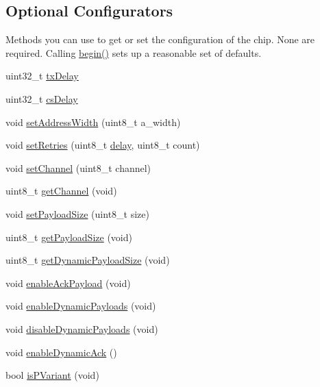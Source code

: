 \subsection*{Optional Configurators}
\label{_amgrpe1a83b99ec8153e5baf680edeeed1586}%
 Methods you can use to get or set the configuration of the chip. None are required. Calling \hyperlink{classRF24_a048a20c73c7d9b2e02dcbae6fb9c4ba8}{begin()} sets up a reasonable set of defaults. \begin{DoxyCompactItemize}
\item 
uint32\+\_\+t \hyperlink{classRF24_a958fb99f54415101ca008ab11b3bfe79}{tx\+Delay}
\item 
uint32\+\_\+t \hyperlink{classRF24_ad08121bf844f08dbe53f51576b7c4066}{cs\+Delay}
\item 
void \hyperlink{classRF24_ad5aea7f9a3bd9c7d357fb296ce751f21}{set\+Address\+Width} (uint8\+\_\+t a\+\_\+width)
\item 
void \hyperlink{classRF24_a4c6d3959c8320e64568395f4ef507aef}{set\+Retries} (uint8\+\_\+t \hyperlink{group__Porting__General_ga70a331e8ddf9acf9d33c47b71cda4c5f}{delay}, uint8\+\_\+t count)
\item 
void \hyperlink{classRF24_a5e6e5a5f6c85d2638381cab2c0f3702e}{set\+Channel} (uint8\+\_\+t channel)
\item 
uint8\+\_\+t \hyperlink{classRF24_a6a66a94609309e17edaa1919e66cea0a}{get\+Channel} (void)
\item 
void \hyperlink{classRF24_a343e5d23477181011dea030fafb1954f}{set\+Payload\+Size} (uint8\+\_\+t size)
\item 
uint8\+\_\+t \hyperlink{classRF24_a0aa0c7cbe3d38fef4722f3f1d2d6c5f1}{get\+Payload\+Size} (void)
\item 
uint8\+\_\+t \hyperlink{classRF24_a65963ed8d8fd45f847e2f673995b85e1}{get\+Dynamic\+Payload\+Size} (void)
\item 
void \hyperlink{classRF24_abf8efced2ee9edbcc6510878b20edc1b}{enable\+Ack\+Payload} (void)
\item 
void \hyperlink{classRF24_a443888504975d7441d6452a09d09a8fa}{enable\+Dynamic\+Payloads} (void)
\item 
void \hyperlink{classRF24_a486c4c47a6973614ae595ae96f221165}{disable\+Dynamic\+Payloads} (void)
\item 
void \hyperlink{classRF24_a6253607ac2a1995af91a35cea6899c31}{enable\+Dynamic\+Ack} ()
\item 
bool \hyperlink{classRF24_a62846750b82682beb7593719eb60ed60}{is\+P\+Variant} (void)
\item 

\end{DoxyCompactItemize}
